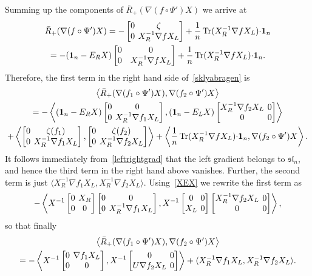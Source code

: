 \documentclass{amsart}
\theoremstyle{definition}
\theoremstyle{remark}
\numberwithin{equation}{section}
\numberwithin{theorem}{section}
\def\nablac{{\nabla}}
\def\nar{\setlength\arraycolsep{2pt}}
\def\one{\mathbf 1}
\def\sl{\mathfrak {sl}}
\def\Tr{\operatorname{Tr}}
\begin{document}
Summing up the components of $\bar R_+(\nabla (f\circ\Psi')X)$ we arrive at
\begin{multline}\label{barRleft}
\bar R_+(\nabla (f\circ\Psi')X)=
-\nar\begin{bmatrix}0&\zeta\cr 0 &X_R^{-1}\nablac f X_L\end{bmatrix}
 +\frac1n\Tr (X_R^{-1}\nablac f X_L) {\cdot}\one_n
\\=-(\one_n-E_RX)\begin{bmatrix}0&0\cr 0 &X_R^{-1}\nablac f X_L\end{bmatrix}
 +\frac1n\Tr (X_R^{-1}\nablac f X_L) {\cdot}\one_n.
\end{multline}
Therefore, the first term in the right hand side of~\eqref{sklyabragen} is 
\begin{multline*}
\left\langle \bar R_+(\nabla(f_1\circ\Psi') X),\nabla(f_2\circ\Psi') X\right\rangle\\
=-\left\langle (\one_n-E_RX)\nar\begin{bmatrix}0&0\cr 0 &X_R^{-1}\nablac f_1 X_L\end{bmatrix},
(\one_n-E_LX)\begin{bmatrix} X_R^{-1}\nablac f_2 X_L &0\cr 0&0\end{bmatrix}\right\rangle\\
+\left\langle\nar\begin{bmatrix}0&\zeta(f_1)\cr 0 &X_R^{-1}\nablac f_1 X_L\end{bmatrix},
\begin{bmatrix}0&\zeta(f_2)\cr 0 &X_R^{-1}\nablac f_2 X_L\end{bmatrix}\right\rangle
+\left\langle\frac1n\Tr (X_R^{-1}\nablac f X_L) {\cdot}\one_n,\nabla(f_2\circ\Psi') X \right\rangle.
\end{multline*}
 It follows immediately from~\eqref{leftrightgrad} that the left gradient belongs to $\sl_n$, and hence the third term
in the right hand above vanishes.
Further, the second term is just $\langle X_R^{-1}\nablac f_1 X_L,X_R^{-1}\nablac f_2 X_L\rangle$.
Using~\eqref{XEX} we rewrite the first term as
\[
-\left\langle X^{-1}\nar\begin{bmatrix} 0&  X_R\cr 0&0\end{bmatrix}\begin{bmatrix} 0 & 0\cr 0& X_R^{-1}\nablac f_1 X_L\end{bmatrix},
X^{-1}\begin{bmatrix} 0& 0\cr X_L& 0\end{bmatrix}\begin{bmatrix} X_R^{-1}\nablac f_2 X_L&0\cr 0&0\end{bmatrix}\right\rangle,
\]
so that finally
\begin{multline}\label{ACGpart}
\left\langle \bar R_+(\nabla(f_1\circ\Psi') X),\nabla(f_2\circ\Psi') X\right\rangle\\
=-\left\langle X^{-1}\nar\begin{bmatrix} 0& \nablac f_1 X_L\cr 0&0\end{bmatrix},
X^{-1}\begin{bmatrix} 0& 0\cr U\nablac f_2 X_L&0\end{bmatrix}\right\rangle+\langle X_R^{-1}\nablac f_1 X_L,X_R^{-1}\nablac f_2 X_L\rangle.
\end{multline}
\end{document}
